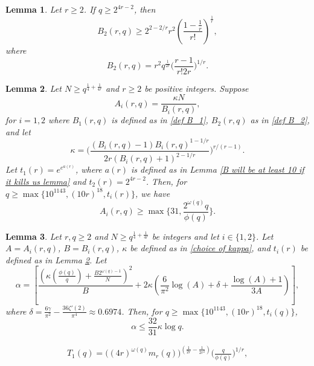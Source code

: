 \documentclass[10pt,a4paper]{amsart}
\newtheorem{lemma}{Lemma}
\begin{document}
\begin{lemma} \label{B will be at least 10 if it kills us lemma 2}
Let $r\ge 2$. If $q \ge 2^{4r-2}$, then $$B_2(r,q)\ge 2^{2-2/r}r^2\left(\frac{1-\frac{1}{r}}{r!}\right)^{\frac{1}{r}},$$
where 
\begin{equation}\label{def B_2}B_2(r,q) = r^2q^{\frac{1}{2r}}\biggl( \frac{r-1}{r!2r} \biggr)^{1/r}.
\end{equation}
\end{lemma}

\begin{lemma} \label{A lower bound lemma}
Let $N \ge q^{\frac{1}{4}+\frac{1}{4r}}$ and $r\ge 2$ be positive integers. Suppose 
$$A_i(r,q) = \frac{\kappa N}{B_i(r,q)},$$
for $i=1,2$ where $B_1(r,q)$ is defined as in \eqref{def B_1}, $B_2(r,q)$ as in \eqref{def B_2}, and let
\begin{equation} \label{choice of kappa}
\kappa = \biggl( \frac{(B_i(r,q)-1) B_i(r,q)^{1-1/r} }{2 r (B_i(r,q)+1)^{2-1/r}}
\biggr)^{r/(r-1)}.
\end{equation}
Let $t_1(r) = e^{e^{a(r)}}$, where $a(r)$ is defined as in Lemma \ref{B will be at least 10 if it kills us lemma} and $t_2(r) = 2^{4r-2}$. Then, for $q\ge \max\bigl\{ 10^{1143}, (10r)^{18}, t_i(r) \bigr\}$, we have 
$$A_i(r,q) \ge \max\biggl\{31, \frac{2^{\omega(q)}q}{\phi(q)}\biggl\}.$$
\end{lemma}

\begin{lemma}\label{lem: alpha bound}
Let $r,q\ge 2$ and $N \ge q^{\frac{1}{4}+\frac{1}{4r}} $ be integers and let $i \in \{1,2\}$. Let $A = A_i(r,q)$, $B = B_i(r,q)$, $\kappa$ be defined as in \eqref{choice of kappa}, and $t_i(r)$ be defined as in Lemma \ref{A lower bound lemma}.
Let
\begin{equation*}
    \alpha
    =
    \left[ \frac{\left(\kappa\left(\frac{\phi(q)}{q}\right)+\frac{B2^{\omega(q)-1}}{N} \right)^2}{B}
    +
    2\kappa\left(\frac{6}{\pi^2}\log{(A)}+\delta+\frac{\log{(A)}+1}{3A}\right)\right],
\end{equation*}
where $\delta = \frac{6\gamma}{\pi^2} - \frac{36\zeta'(2)}{\pi^4} \approx 0.6974 $.
Then, for $q\ge \max\{10^{1143}, (10r)^{18}, t_i(q)\}$,
$$\alpha \le \frac{32}{31}\kappa \log{q}.$$
\end{lemma}

\begin{align}\label{eq T1}
    T_1(q) = \bigl((4r)^{\omega(q)} m_r(q)\bigr)^{\left({\frac{1}{2r}-\frac{1}{2r^2}}\right)} \biggl( \frac q{\phi(q)} \biggr)^{1/r},
\end{align}
\end{document}

